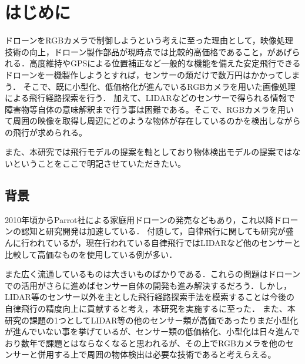 \section{はじめに}
ドローンをRGBカメラで制御しようという考えに至った理由として，映像処理技術の向上，ドローン製作部品が現時点では比較的高価格であること，があげられる．高度維持やGPSによる位置補正など一般的な機能を備えた安定飛行できるドローンを一機製作しようとすれば，センサーの類だけで数万円はかかってしまう．
そこで、既に小型化、低価格化が進んでいるRGBカメラを用いた画像処理による飛行経路探索を行う．
加えて、LIDARなどのセンサーで得られる情報で障害物等自体の意味解釈まで行う事は困難である。そこで、RGBカメラを用いて周囲の映像を取得し周辺にどのような物体が存在しているのかを検出しながらの飛行が求められる。

また、本研究では飛行モデルの提案を軸としており物体検出モデルの提案ではないということをここで明記させていただきたい。


\subsection{背景}
2010年頃からParrot社による家庭用ドローンの発売などもあり，これ以降ドローンの認知と研究開発は加速している．
付随して，自律飛行に関しても研究が盛んに行われているが，現在行われている自律飛行ではLIDARなど他のセンサーと比較して高価なものを使用している例が多い．

また広く流通しているものは大きいものばかりである．これらの問題はドローンでの活用がさらに進めばセンサー自体の開発も進み解決するだろう．しかし，LIDAR等のセンサー以外を主とした飛行経路探索手法を模索することは今後の自律飛行の精度向上に貢献すると考え，本研究を実施するに至った．
また、本研究の課題の1つとしてLIDAR等の他のセンサー類が高価であったりまだ小型化が進んでいない事を挙げているが、センサー類の低価格化、小型化は日々進んでおり数年で課題とはならなくなると思われるが、その上でRGBカメラを他のセンサーと併用する上で周囲の物体検出は必要な技術であると考えらえる。


